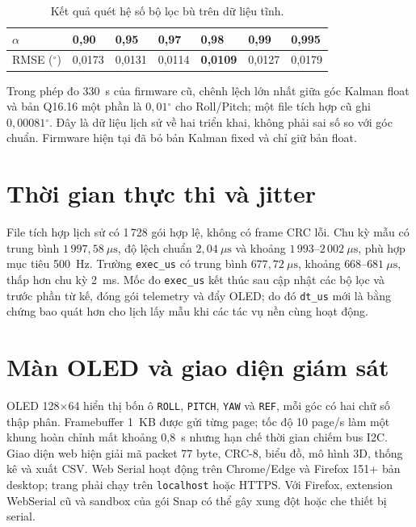\documentclass[14pt,a4paper,oneside]{extreport}
\newcommand{\degree}{\ensuremath{^{\circ}}}
\begin{document}
\begin{table}[htbp]\centering\fontsize{12}{17}\selectfont
\caption{Kết quả quét hệ số bộ lọc bù trên dữ liệu tĩnh.}\label{tab:alpha}
\begin{tabular}{|C{20mm}|*{6}{C{17mm}|}}
\hline $\alpha$ & 0,90 & 0,95 & 0,97 & 0,98 & 0,99 & 0,995\\ \hline
RMSE ($\degree$) & 0,0173 & 0,0131 & 0,0114 & \textbf{0,0109} & 0,0127 & 0,0179\\ \hline
\hline
\end{tabular}
\end{table}

Trong phép đo 330~s của firmware cũ, chênh lệch lớn nhất giữa góc Kalman float và bản Q16.16 một phần là $0{,}01\degree$ cho Roll/Pitch; một file tích hợp cũ ghi $0{,}00081\degree$. Đây là dữ liệu lịch sử về hai triển khai, không phải sai số so với góc chuẩn. Firmware hiện tại đã bỏ bản Kalman fixed và chỉ giữ bản float.

\section{Thời gian thực thi và jitter}
File tích hợp lịch sử có 1\,728 gói hợp lệ, không có frame CRC lỗi. Chu kỳ mẫu có trung bình $1\,997{,}58~\mu\mathrm{s}$, độ lệch chuẩn $2{,}04~\mu\mathrm{s}$ và khoảng $1\,993$--$2\,002~\mu\mathrm{s}$, phù hợp mục tiêu 500~Hz. Trường \texttt{exec\_us} có trung bình $677{,}72~\mu\mathrm{s}$, khoảng $668$--$681~\mu\mathrm{s}$, thấp hơn chu kỳ 2~ms. Mốc đo \texttt{exec\_us} kết thúc sau cập nhật các bộ lọc và trước phần từ kế, đóng gói telemetry và đẩy OLED; do đó \texttt{dt\_us} mới là bằng chứng bao quát hơn cho lịch lấy mẫu khi các tác vụ nền cùng hoạt động.

\section{Màn OLED và giao diện giám sát}
OLED 128$\times$64 hiển thị bốn ô \texttt{ROLL}, \texttt{PITCH}, \texttt{YAW} và \texttt{REF}, mỗi góc có hai chữ số thập phân. Framebuffer 1~KB được gửi từng page; tốc độ 10 page/s làm một khung hoàn chỉnh mất khoảng 0,8~s nhưng hạn chế thời gian chiếm bus I2C. Giao diện web hiện giải mã packet 77 byte, CRC-8, biểu đồ, mô hình 3D, thống kê và xuất CSV. Web Serial hoạt động trên Chrome/Edge và Firefox 151+ bản desktop; trang phải chạy trên \texttt{localhost} hoặc HTTPS. Với Firefox, extension WebSerial cũ và sandbox của gói Snap có thể gây xung đột hoặc che thiết bị serial.
\end{document}
